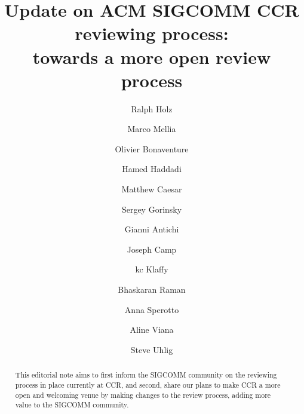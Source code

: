 \documentclass[sigconf]{acmart}
\begin{document}
    
    \title{Update on ACM SIGCOMM CCR reviewing process:\\ towards a more open review process}
        
    \author{Ralph Holz}
    
    \author{Marco Mellia}
    
    \author{Olivier Bonaventure}
    
    \author{Hamed Haddadi}

    \author{Matthew Caesar}

    \author{Sergey Gorinsky}

    \author{Gianni Antichi}

    \author{Joseph Camp}

    \author{kc Klaffy}


    \author{Bhaskaran Raman}

    \author{Anna Sperotto}


    \author{Aline Viana}

    \author{Steve Uhlig}
        
    
    \begin{abstract}
        
This editorial note aims to first inform the SIGCOMM community on the reviewing
        process in place currently at CCR, and second, share our plans to make
        CCR a more open and welcoming venue by making changes to the review
        process, adding more value to the SIGCOMM community.

    \end{abstract}
    
\end{document}
